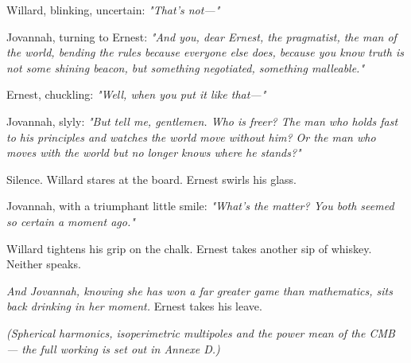 \bigskip

Willard, blinking, uncertain: \textit{"That’s not—"}

\bigskip

Jovannah, turning to Ernest: \textit{"And you, dear Ernest, the pragmatist, the man of the world, bending the rules because everyone else does, because you know truth is not some shining beacon, but something negotiated, something malleable."}

\bigskip

Ernest, chuckling: \textit{"Well, when you put it like that—"}

\bigskip

Jovannah, slyly: \textit{"But tell me, gentlemen. Who is freer? The man who holds fast to his principles and watches the world move without him? Or the man who moves with the world but no longer knows where he stands?"}

\bigskip

Silence. Willard stares at the board. Ernest swirls his glass.

\bigskip

Jovannah, with a triumphant little smile: \textit{"What’s the matter? You both seemed so certain a moment ago."}

\bigskip

Willard tightens his grip on the chalk. Ernest takes another sip of whiskey. Neither speaks.

\bigskip

\textit{And Jovannah, knowing she has won a far greater game than mathematics, sits back drinking in her moment.} Ernest takes his leave.

\smallskip

\textit{(Spherical harmonics, isoperimetric multipoles and the power mean of the CMB --- the full working is set out in Annexe D.)}

